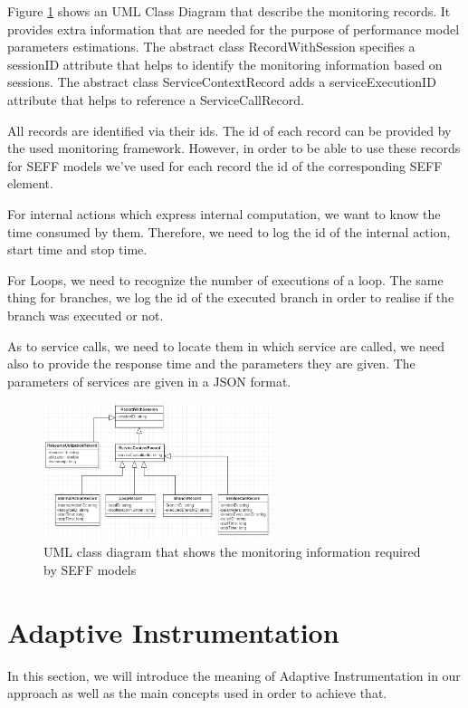 Figure \ref{fig:records} shows an UML Class Diagram that describe the monitoring records. It provides extra information that are needed for the purpose of performance model parameters estimations. The abstract class RecordWithSession specifies a sessionID attribute that helps to identify the monitoring information based on sessions.  The abstract class ServiceContextRecord adds a serviceExecutionID attribute that helps to reference a ServiceCallRecord.

All records are identified via their ids. The id of each record can be provided by the used monitoring framework. However, in order to be able to use these records for SEFF models we've used for each record the id of the corresponding SEFF element. 

For internal actions which express internal computation, we want to know the time consumed by them. Therefore, we need to log the id of the internal action, start time and stop time. 

For Loops, we need to recognize the number of executions of a loop. The same thing for branches, we log the id of the executed branch in order to realise if the branch was executed or not. 

As to service calls, we need to locate them in which service are called, we need also to provide the response time and the parameters they are given. The parameters of services are given in a JSON format.

\begin{figure}[h]
\centering
\includegraphics[width=0.6\textwidth]{figures/records}
\caption{UML class diagram that shows the monitoring information required by SEFF models}
\label{fig:records}
\end{figure}

\section{Adaptive Instrumentation }
\label{sec:Adaptive Instrumentation}
In this section, we will introduce the meaning of Adaptive Instrumentation in our approach as well as the main concepts used in order to achieve that.

